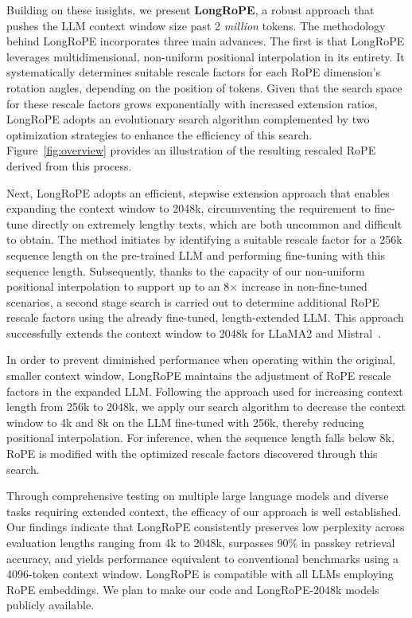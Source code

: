 Building on these insights, we present \textbf{LongRoPE}, a robust approach that pushes the LLM context window size past 2 \emph{million} tokens. The methodology behind LongRoPE incorporates three main advances. The first is that {LongRoPE} leverages multidimensional, non-uniform positional interpolation in its entirety. It systematically determines suitable rescale factors for each RoPE dimension’s rotation angles, depending on the position of tokens. Given that the search space for these rescale factors grows exponentially with increased extension ratios, {LongRoPE} adopts an evolutionary search algorithm complemented by two optimization strategies to enhance the efficiency of this search. Figure~\ref{fig:overview} provides an illustration of the resulting rescaled RoPE derived from this process.

Next, {LongRoPE} adopts an efficient, stepwise extension approach that enables expanding the context window to 2048k, circumventing the requirement to fine-tune directly on extremely lengthy texts, which are both uncommon and difficult to obtain. The method initiates by identifying a suitable rescale factor for a 256k sequence length on the pre-trained LLM and performing fine-tuning with this sequence length. Subsequently, thanks to the capacity of our non-uniform positional interpolation to support up to an 8$\times$ increase in non-fine-tuned scenarios, a second stage search is carried out to determine additional RoPE rescale factors using the already fine-tuned, length-extended LLM. This approach successfully extends the context window to 2048k for LLaMA2 and Mistral~\cite{mistral}.

In order to prevent diminished performance when operating within the original, smaller context window, {LongRoPE} maintains the adjustment of RoPE rescale factors in the expanded LLM. Following the approach used for increasing context length from 256k to 2048k, we apply our search algorithm to decrease the context window to 4k and 8k on the LLM fine-tuned with 256k, thereby reducing positional interpolation. For inference, when the sequence length falls below 8k, RoPE is modified with the optimized rescale factors discovered through this search.

Through comprehensive testing on multiple large language models and diverse tasks requiring extended context, the efficacy of our approach is well established. Our findings indicate that LongRoPE consistently preserves low perplexity across evaluation lengths ranging from 4k to 2048k, surpasses 90\% in passkey retrieval accuracy, and yields performance equivalent to conventional benchmarks using a 4096-token context window. LongRoPE is compatible with all LLMs employing RoPE embeddings. We plan to make our code and LongRoPE-2048k models publicly available.


